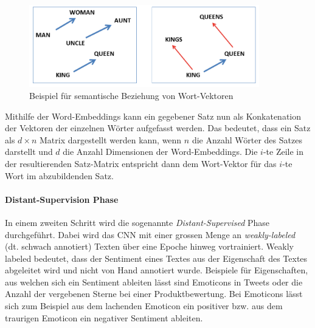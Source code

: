 \begin{figure}[H]
  \label{fig:king_queen_example}
  \centering
  \includegraphics[width=10cm]{img/king_queen_example_word_embeddings}
  \caption{Beispiel für semantische Beziehung von Wort-Vektoren}
\end{figure}

Mithilfe der Word-Embeddings kann ein gegebener Satz nun als Konkatenation der Vektoren der einzelnen Wörter aufgefasst werden. Das bedeutet, dass ein Satz als $d \times n$ Matrix dargestellt werden kann, wenn $n$ die Anzahl Wörter des Satzes darstellt und $d$ die Anzahl Dimensionen der Word-Embeddings. Die $i$-te Zeile in der resultierenden Satz-Matrix entspricht dann dem Wort-Vektor für das $i$-te Wort im abzubildenden Satz.

\paragraph{Distant-Supervision Phase} In einem zweiten Schritt wird die sogenannte \emph{Distant-Supervised} Phase durchgeführt. Dabei wird das CNN mit einer grossen Menge an \emph{weakly-labeled} (dt. schwach annotiert) Texten über eine Epoche hinweg vortrainiert. Weakly labeled bedeutet, dass der Sentiment eines Textes aus der Eigenschaft des Textes abgeleitet wird und nicht von Hand annotiert wurde. Beispiele für Eigenschaften, aus welchen sich ein Sentiment ableiten lässt sind Emoticons in Tweets oder die Anzahl der vergebenen Sterne bei einer Produktbewertung. Bei Emoticons lässt sich zum Beispiel aus dem lachenden Emoticon \quotes{:-)} ein positiver bzw. aus dem traurigen Emoticon \quotes{:-(} ein negativer Sentiment ableiten.


